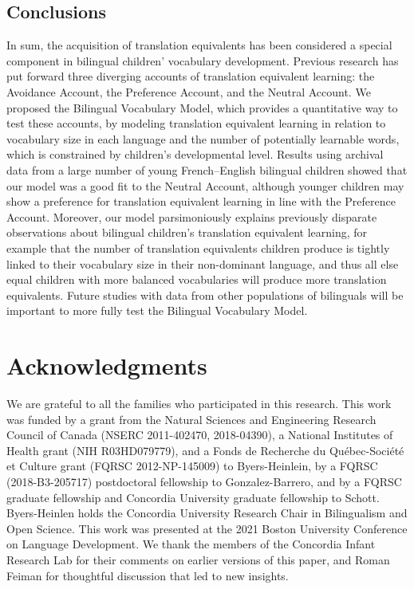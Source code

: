 \documentclass[
  english,
  ,man,floatsintext]{apa6}
\begin{document}
\hypertarget{conclusions}{%
\subsection{Conclusions}\label{conclusions}}

In sum, the acquisition of translation equivalents has been considered a special component in bilingual children' vocabulary development. Previous research has put forward three diverging accounts of translation equivalent learning: the Avoidance Account, the Preference Account, and the Neutral Account. We proposed the Bilingual Vocabulary Model, which provides a quantitative way to test these accounts, by modeling translation equivalent learning in relation to vocabulary size in each language and the number of potentially learnable words, which is constrained by children's developmental level. Results using archival data from a large number of young French--English bilingual children showed that our model was a good fit to the Neutral Account, although younger children may show a preference for translation equivalent learning in line with the Preference Account. Moreover, our model parsimoniously explains previously disparate observations about bilingual children's translation equivalent learning, for example that the number of translation equivalents children produce is tightly linked to their vocabulary size in their non-dominant language, and thus all else equal children with more balanced vocabularies will produce more translation equivalents. Future studies with data from other populations of bilinguals will be important to more fully test the Bilingual Vocabulary Model.

\newpage

\hypertarget{acknowledgments}{%
\section{Acknowledgments}\label{acknowledgments}}

\noindent We are grateful to all the families who participated in this research. This work was funded by a grant from the Natural Sciences and Engineering Research Council of Canada (NSERC 2011-402470, 2018-04390), a National Institutes of Health grant (NIH R03HD079779), and a Fonds de Recherche du Québec-Société et Culture grant (FQRSC 2012-NP-145009) to Byers-Heinlein, by a FQRSC (2018-B3-205717) postdoctoral fellowship to Gonzalez-Barrero, and by a FQRSC graduate fellowship and Concordia University graduate fellowship to Schott. Byers-Heinlen holds the Concordia University Research Chair in Bilingualism and Open Science. This work was presented at the 2021 Boston University Conference on Language Development. We thank the members of the Concordia Infant Research Lab for their comments on earlier versions of this paper, and Roman Feiman for thoughtful discussion that led to new insights.
\end{document}
